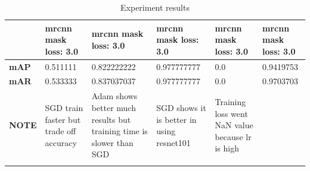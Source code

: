 \begin{longtable}[c]{|p{}|p{}|p{}|p{}|p{}|p{}|}
		& mrcnn mask loss: 3.0 & mrcnn mask loss: 3.0 & mrcnn mask loss: 3.0 & mrcnn mask loss: 3.0 & mrcnn mask loss: 3.0 \\ \hline
		
		\textbf{mAP} & 0.511111 & 0.822222222 & 0.977777777 & 0.0 & 0.9419753 \\ \hline
		\textbf{mAR} & 0.533333 & 0.837037037 & 0.977777777 & 0.0 & 0.9703703 \\ \hline
		\textbf{NOTE} & SGD train faster but trade off accuracy & Adam shows better much results but training time is slower than SGD & SGD shows it is better in using resnet101 & Training loss went NaN value because lr is high &  \\ \hline
		
		\caption{Experiment results}
		\label{table:exp1}
	\end{longtable}

